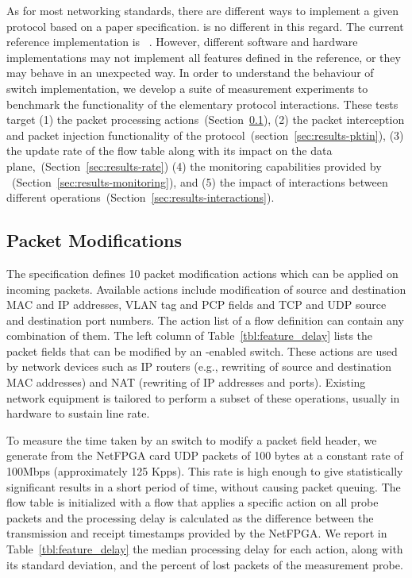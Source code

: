 As for most networking standards, there are different ways to implement a given
protocol based on a paper specification. \of is no different in this regard. The
current \of reference implementation is \ovs~\cite{openvswitch}. However,
different software and hardware implementations may not implement all features
defined in the \ovs reference, or they may behave in an unexpected way. In order
to understand the behaviour of switch \of implementation, we develop a suite of
measurement experiments to benchmark the functionality of the elementary
protocol interactions.  These tests target (1) the \of packet processing
actions~(Section~\ref{sec:results-packets}), (2) the packet interception and
packet injection functionality of the
protocol~(section~\ref{sec:results-pktin}), (3) the update rate of the \of flow
table along with its impact on the data plane,~(Section~\ref{sec:results-rate})
(4) the monitoring capabilities provided by
\of~(Section~\ref{sec:results-monitoring}), and (5) the impact of interactions
between different \of operations~(Section~\ref{sec:results-interactions}).


\subsection{Packet Modifications}\label{sec:results-packets}

The \of specification \cite{openflow-spec} defines 10 packet modification
actions which can be applied on incoming packets. Available actions include
modification of source and destination MAC and IP addresses, VLAN tag and PCP
fields and TCP and UDP source and destination port numbers. The action list
of a flow definition can contain any combination of them. The left column of
Table~\ref{tbl:feature_delay} lists the packet fields that can be modified by an
\of-enabled switch.  These actions are used by network devices such as IP
routers (e.g., rewriting of source and destination MAC addresses) and NAT
(rewriting of IP addresses and ports). Existing network equipment is tailored to
perform a subset of these operations, usually in hardware to sustain line rate.

To measure the time taken by an \of switch to modify a packet field header, we
generate from the NetFPGA card UDP packets of 100 bytes at a constant rate of
100Mbps (approximately 125 Kpps).  This rate is high enough to give
statistically significant results in a short period of time, without causing
packet queuing.  The flow table is initialized with a flow that applies a
specific action on all probe packets and the processing delay is calculated as
the difference between the transmission and receipt timestamps provided by the
NetFPGA.  We report in Table~\ref{tbl:feature_delay} the median processing delay
for each action, along with its standard deviation, and the percent of lost
packets of the measurement probe.

